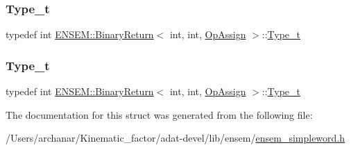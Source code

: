 \mbox{\label{structENSEM_1_1BinaryReturn_3_01int_00_01int_00_01OpAssign_01_4_a9190cc9e0398fc2b905dca61a8089bf3}} 
\subsubsection{\texorpdfstring{Type\_t}{Type\_t}\hspace{0.1cm}{\footnotesize\ttfamily [2/3]}}
{\footnotesize\ttfamily typedef int \mbox{\hyperlink{structENSEM_1_1BinaryReturn}{E\+N\+S\+E\+M\+::\+Binary\+Return}}$<$ int, int, \mbox{\hyperlink{structENSEM_1_1OpAssign}{Op\+Assign}} $>$\+::\mbox{\hyperlink{structENSEM_1_1BinaryReturn_3_01int_00_01int_00_01OpAssign_01_4_a9190cc9e0398fc2b905dca61a8089bf3}{Type\+\_\+t}}}

\mbox{\label{structENSEM_1_1BinaryReturn_3_01int_00_01int_00_01OpAssign_01_4_a9190cc9e0398fc2b905dca61a8089bf3}} 
\subsubsection{\texorpdfstring{Type\_t}{Type\_t}\hspace{0.1cm}{\footnotesize\ttfamily [3/3]}}
{\footnotesize\ttfamily typedef int \mbox{\hyperlink{structENSEM_1_1BinaryReturn}{E\+N\+S\+E\+M\+::\+Binary\+Return}}$<$ int, int, \mbox{\hyperlink{structENSEM_1_1OpAssign}{Op\+Assign}} $>$\+::\mbox{\hyperlink{structENSEM_1_1BinaryReturn_3_01int_00_01int_00_01OpAssign_01_4_a9190cc9e0398fc2b905dca61a8089bf3}{Type\+\_\+t}}}



The documentation for this struct was generated from the following file\+:\begin{DoxyCompactItemize}
\item 
/\+Users/archanar/\+Kinematic\+\_\+factor/adat-\/devel/lib/ensem/\mbox{\hyperlink{adat-devel_2lib_2ensem_2ensem__simpleword_8h}{ensem\+\_\+simpleword.\+h}}\end{DoxyCompactItemize}
